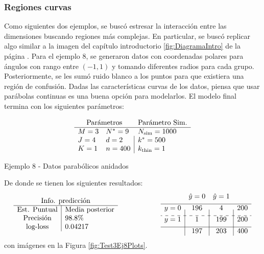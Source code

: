 \documentclass[../Main/Main.tex]{subfiles}
\begin{document}
\subsubsection{Regiones curvas}
Como siguientes dos ejemplos, se buscó estresar la interacción entre las dimensiones buscando regiones más complejas. En particular, se buscó replicar algo similar a la imagen del capítulo introductorio \ref{fig:DiagramaIntro} de la página \pageref{fig:DiagramaIntro}. Para el ejemplo 8, se generaron datos con coordenadas polares para ángulos con rango entre $(-1,1)$ y tomando diferentes radios para cada grupo. Posteriormente, se les sumó ruido blanco a los puntos para que existiera una región de confusión. Dadas las características curvas de los datos, piensa que usar parábolas continuas es una buena opción para modelarlos. El modelo final termina con los siguientes parámetros: 
\begin{table}[H]
$$\paramsmod{3}{4}{1}{9}{2}{400}{1000}{500}{1}$$
\caption*{Ejemplo 8 - Datos parabólicos anidados}
\label{ej:8}
\end{table}
De donde se tienen los siguientes resultados:
\begin{align*}
\resultados{\text{Media posterior}}{98.8}{0.04217}
\qquad\qquad\qquad
\matconf{196}{4}{200}{1}{199}{200}{197}{203}{400}
\end{align*}
con imágenes en la Figura \ref{fig:Test3Ej8Plots}.
\end{document}
